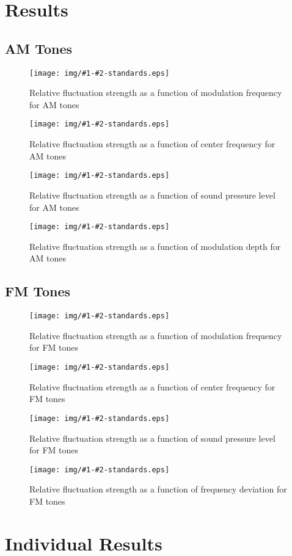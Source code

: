 \documentclass[a4paper]{article}
\newcommand{\figStds}[3]{
\begin{figure}[ht!]
  \centering
  \texttt{[image: img/\#1-\#2-standards.eps]}
  \caption{#3}
\label{fig:#1-#2}
\end{figure}
}
\begin{document}

\section{Results} %
\label{sec:results}

\subsection{AM Tones} %
\label{subsec:results_am_tones}

\figStds{AM-fm}
  {All}
  {Relative fluctuation strength as a function of modulation frequency for AM
  tones}

\figStds{AM-fc}
  {All}
  {Relative fluctuation strength as a function of center frequency for AM
  tones}

\figStds{AM-SPL}
  {All}
  {Relative fluctuation strength as a function of sound pressure level for AM
  tones}

\figStds{AM-md}
  {All}
  {Relative fluctuation strength as a function of modulation depth for AM
  tones}


\subsection{FM Tones} %
\label{subsec:results_fm_tones}

\figStds{FM-fm}
  {All}
  {Relative fluctuation strength as a function of modulation frequency for FM
  tones}

\figStds{FM-fc}
  {All}
  {Relative fluctuation strength as a function of center frequency for FM
  tones}

\figStds{FM-SPL}
  {All}
  {Relative fluctuation strength as a function of sound pressure level for FM
  tones}

\figStds{FM-df}
  {All}
  {Relative fluctuation strength as a function of frequency deviation for FM
  tones}



\clearpage

\appendix

\section{Individual Results} %
\label{sec:individual_results}
\end{document}
